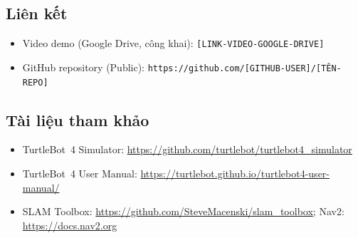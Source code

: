 \subsection{Liên kết}
\begin{itemize}
\item Video demo (Google Drive, công khai): \texttt{[LINK-VIDEO-GOOGLE-DRIVE]}
\item GitHub repository (Public): \texttt{https://github.com/[GITHUB-USER]/[TÊN-REPO]}
\end{itemize}

\subsection{Tài liệu tham khảo}
\begin{itemize}
\item TurtleBot~4 Simulator: \url{https://github.com/turtlebot/turtlebot4_simulator}
\item TurtleBot~4 User Manual: \url{https://turtlebot.github.io/turtlebot4-user-manual/}
\item SLAM Toolbox: \url{https://github.com/SteveMacenski/slam_toolbox}; Nav2: \url{https://docs.nav2.org}
\end{itemize}
